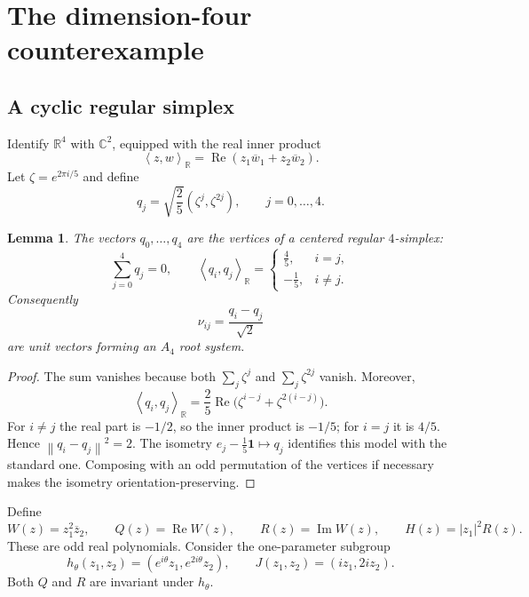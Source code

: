 \documentclass[11pt,reqno]{amsart}
\newtheorem{lemma}[theorem]{Lemma}
\theoremstyle{definition}
\theoremstyle{remark}
\newcommand{\R}{\mathbb R}
\newcommand{\C}{\mathbb C}
\newcommand{\one}{\mathbf 1}
\newcommand{\ip}[2]{\left\langle #1,#2\right\rangle}
\newcommand{\norm}[1]{\left\lVert #1\right\rVert}
\newcommand{\abs}[1]{\left\lvert #1\right\rvert}
\begin{document}
\section{The dimension-four counterexample}\label{sec:counterexample}

\subsection{A cyclic regular simplex}

Identify $\R^4$ with $\C^2$, equipped with the real inner product
\[
\ip{z}{w}_{\R}=\operatorname{Re}(z_1\overline w_1+z_2\overline w_2).
\]
Let $\zeta=e^{2\pi i/5}$ and define
\begin{equation}\label{eq:cyclic-simplex}
q_j=\sqrt{\frac25}(\zeta^j,\zeta^{2j}),\qquad j=0,\dots,4.
\end{equation}

\begin{lemma}\label{lem:cyclic-simplex}
The vectors $q_0,\dots,q_4$ are the vertices of a centered regular
$4$-simplex:
\[
\sum_{j=0}^4q_j=0,
\qquad
\ip{q_i}{q_j}_{\R}=
\begin{cases}
\frac45,&i=j,\\[1mm]
-\frac15,&i\ne j.
\end{cases}
\]
Consequently
\begin{equation}\label{eq:a4-cyclic-roots}
\nu_{ij}=\frac{q_i-q_j}{\sqrt2}
\end{equation}
are unit vectors forming an $A_4$ root system.
\end{lemma}

\begin{proof}
The sum vanishes because both $\sum_j\zeta^j$ and $\sum_j\zeta^{2j}$ vanish.
Moreover,
\[
\ip{q_i}{q_j}_{\R}
=\frac25\operatorname{Re}\bigl(\zeta^{i-j}+\zeta^{2(i-j)}\bigr).
\]
For $i\ne j$ the real part is $-1/2$, so the inner product is $-1/5$;
for $i=j$ it is $4/5$.  Hence $\norm{q_i-q_j}^2=2$.
The isometry $e_j-\frac15\one\mapsto q_j$ identifies this model with the
standard one.  Composing with an odd permutation of the vertices if necessary
makes the isometry orientation-preserving.
\end{proof}

Define
\begin{equation}\label{eq:QRH}
W(z)=z_1^2\overline z_2,
\qquad
Q(z)=\operatorname{Re}W(z),
\qquad
R(z)=\operatorname{Im}W(z),
\qquad
H(z)=\abs{z_1}^2R(z).
\end{equation}
These are odd real polynomials.  Consider the one-parameter subgroup
\begin{equation}\label{eq:weighted-circle}
h_\theta(z_1,z_2)=(e^{i\theta}z_1,e^{2i\theta}z_2),
\qquad
J(z_1,z_2)=(iz_1,2iz_2).
\end{equation}
Both $Q$ and $R$ are invariant under $h_\theta$.
\end{document}
